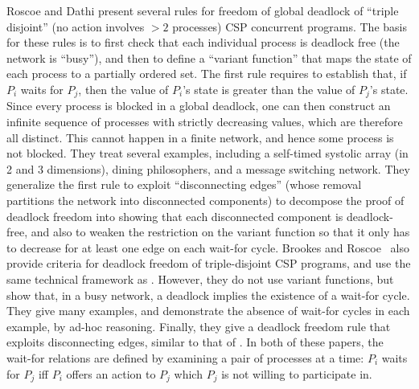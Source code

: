 Roscoe and Dathi \cite{RD87} present several rules for freedom of global deadlock of
``triple disjoint'' (no action involves $> 2$ processes) CSP concurrent
programs. The basis for these rules is to first check that each individual process is deadlock free
(\ie the network is ``busy''), and then to define a ``variant function'' that maps the state of each
process to a partially ordered set. The first rule requires to establish that, if $P_i$ waits for
$P_j$, then the value of $P_i$'s state is greater than the value of $P_j$'s state. 
Since every process is blocked in a global deadlock, one can then construct an infinite sequence of
processes with strictly decreasing values, which are therefore all distinct. This cannot happen in a
finite network, and hence some process is not blocked.
They treat several examples, including
a self-timed systolic array (in 2 and 3 dimensions), dining philosophers, and a message switching
network.  They generalize the first rule to exploit ``disconnecting edges'' (whose removal
partitions the network into disconnected components) to decompose the proof of deadlock freedom into
showing that each disconnected component is deadlock-free, and also to weaken the restriction on the
variant function so that it only has to decrease for at least one edge on each wait-for cycle.
%
Brookes and Roscoe~\cite{BR91} also provide criteria for deadlock
freedom of triple-disjoint CSP programs, and use the same technical framework as
\cite{RD87}.  However, they do not use variant functions, but show that, in a busy
network, a deadlock implies the existence of a wait-for cycle. They give many examples,
and demonstrate the absence of wait-for cycles in each example, by ad-hoc
reasoning. Finally, they give a deadlock freedom rule that exploits disconnecting edges,
similar to that of \cite{RD87}.
%
In both of these papers, the wait-for relations are defined by examining a pair of processes
at a time: $P_i$ waits for $P_j$ iff $P_i$ offers an action to $P_j$ which $P_j$ is
not willing to participate in.

